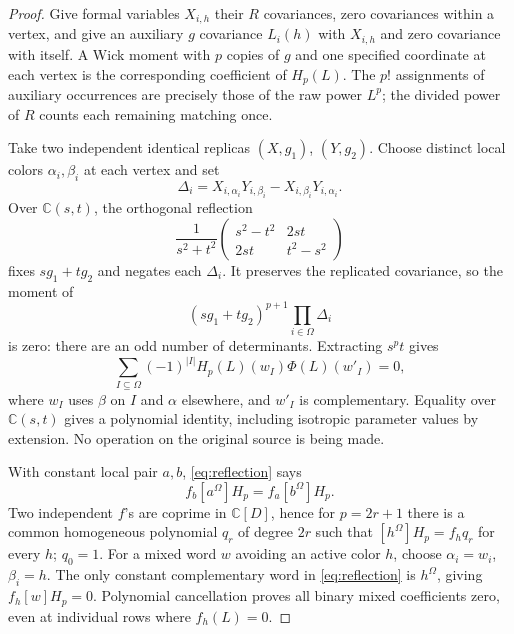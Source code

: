 \documentclass[11pt]{article}
\numberwithin{equation}{section}
\begin{document}
\begin{proof}
Give formal variables \(X_{i,h}\) their \(R\) covariances, zero covariances
within a vertex, and give an auxiliary \(g\) covariance \(L_i(h)\) with
\(X_{i,h}\) and zero covariance with itself. A Wick moment with \(p\) copies
of \(g\) and one specified coordinate at each vertex is the corresponding
coefficient of \(H_p(L)\). The \(p!\) assignments of auxiliary occurrences
are precisely those of the raw power \(L^p\); the divided power of \(R\)
counts each remaining matching once.

Take two independent identical replicas \((X,g_1)\), \((Y,g_2)\). Choose
distinct local colors \(\alpha_i,\beta_i\) at each vertex and set
\[
 \Delta_i=X_{i,\alpha_i}Y_{i,\beta_i}
              -X_{i,\beta_i}Y_{i,\alpha_i}.
\]
Over \(\mathbb C(s,t)\), the orthogonal reflection
\[
 \frac{1}{s^2+t^2}
 \begin{pmatrix}s^2-t^2&2st\\2st&t^2-s^2\end{pmatrix}
\]
fixes \(sg_1+tg_2\) and negates each \(\Delta_i\). It preserves the replicated
covariance, so the moment of
\[
 (sg_1+tg_2)^{p+1}\prod_{i\in\Omega}\Delta_i
\]
is zero: there are an odd number of determinants. Extracting \(s^pt\) gives
\begin{equation}
 \sum_{I\subseteq\Omega}(-1)^{|I|}H_p(L)(w_I)\Phi(L)(w'_I)=0,
 \tag{3}\label{eq:reflection}
\end{equation}
where \(w_I\) uses \(\beta\) on \(I\) and \(\alpha\) elsewhere, and \(w'_I\)
is complementary. Equality over \(\mathbb C(s,t)\) gives a polynomial identity,
including isotropic parameter values by extension. No operation on the
original source is being made.

With constant local pair \(a,b\), \eqref{eq:reflection} says
\[
 f_b[a^\Omega]H_p=f_a[b^\Omega]H_p.
\]
Two independent \(f\)'s are coprime in \(\mathbb C[D]\), hence for
\(p=2r+1\) there is a common homogeneous polynomial \(q_r\) of degree
\(2r\) such that \([h^\Omega]H_p=f_hq_r\) for every \(h\); \(q_0=1\).
For a mixed word \(w\) avoiding an active color \(h\), choose
\(\alpha_i=w_i\), \(\beta_i=h\). The only constant complementary word in
\eqref{eq:reflection} is \(h^\Omega\), giving \(f_h[w]H_p=0\). Polynomial
cancellation proves all binary mixed coefficients zero, even at individual
rows where \(f_h(L)=0\).


\end{proof}
\end{document}
